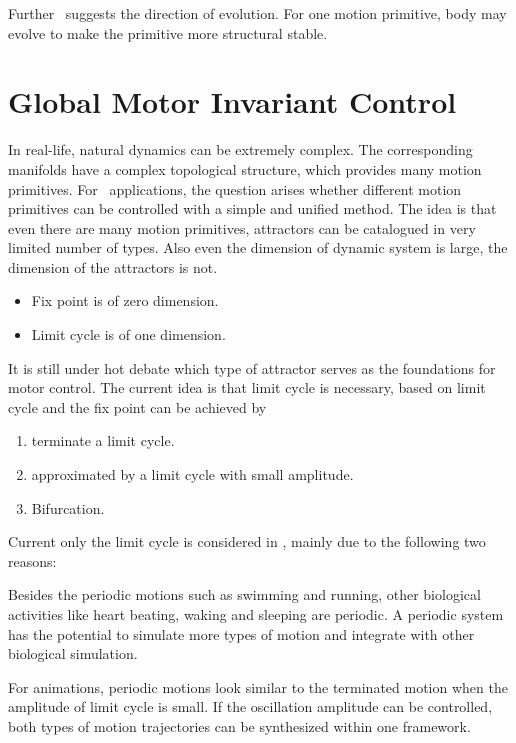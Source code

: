 Further \moit\ suggests the direction of evolution.
For one motion primitive, body may evolve to make the primitive more structural stable.






\section{Global Motor Invariant Control}
\label{sec:cpgcontrol}

In real-life,  natural dynamics can be extremely complex. 
The corresponding manifolds have a complex topological structure, which provides many motion primitives.
For \cms\ applications, the question arises whether different motion primitives can be controlled with a simple and unified method.
The idea is that even there are many motion primitives, attractors can be catalogued in very limited number of types. 
Also even the dimension of dynamic system is large, the dimension of the attractors is not. 
\begin{itemize}
\item Fix point is of zero dimension. 
\item Limit cycle is of one dimension.
\end{itemize}



It is  still under hot debate which type of attractor serves as the foundations for motor control\citep{Degallier2010}.
The current idea is that limit cycle is necessary, based on limit cycle and the fix point can be achieved by
\begin{enumerate} 
\item terminate a limit cycle. 
\item approximated by a limit cycle with small amplitude.
\item Bifurcation. 
\end{enumerate}


Current only the limit cycle is considered in \moit, mainly due to the following two reasons:
\begin{itemize}
Besides the periodic motions such as swimming and running, other biological activities like heart beating, waking and sleeping  are periodic.
A periodic system has the potential to simulate more types of motion and integrate with other biological simulation.

For animations, periodic motions look similar to the terminated motion when the amplitude of limit cycle is small. 
If the oscillation amplitude can be controlled, both types of motion trajectories can be synthesized within one framework.
\end{itemize}

